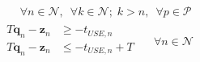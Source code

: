 \documentclass{beamer}
\begin{document}
\begin{frame}
\begin{equation*}
\begin{split}
    \end{split}
    \quad
    \begin{split}
        \forall n \in \mathcal{N}, \enspace \forall k \in \mathcal{N}; \; 
        k > n, \enspace \forall p \in \mathcal{P}
    \end{split}
\end{equation*}
\begin{equation*}
    \begin{split}
        \begin{alignedat}{2}
            T \boldsymbol{q}_{n} - \boldsymbol{z}_{n} &\ge
            - t_{\mathit{USE},n}\\
            T \boldsymbol{q}_{n} - \boldsymbol{z}_{n} &\le
            - t_{\mathit{USE},n} + T\\
        \end{alignedat}
    \end{split}
    \quad \forall n \in \mathcal{N}
\end{equation*}
\end{frame}
\end{document}
